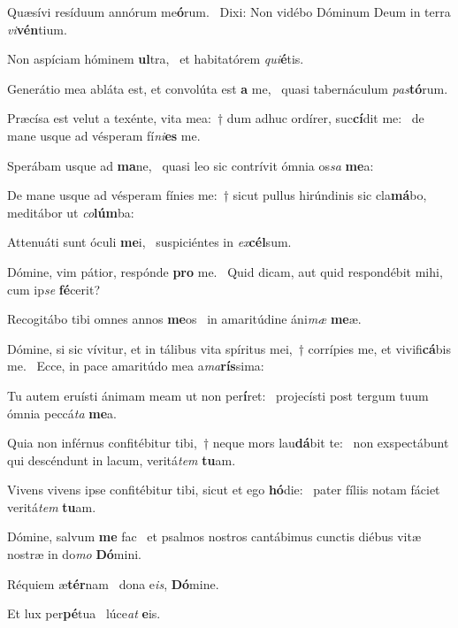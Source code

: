 \item Quæsívi resíduum annórum me\textbf{ó}rum.~\psstar{} Dixi: Non vidébo Dóminum Deum in terra \textit{vi}\textbf{vén}tium.

\item Non aspíciam hóminem \textbf{ul}tra,~\psstar{} et habitatórem \textit{qui}\textbf{é}tis.

\item Generátio mea abláta est, et convolúta est \textbf{a} me,~\psstar{} quasi tabernáculum \textit{pas}\textbf{tó}rum.

\item Præcísa est velut a texénte, vita mea:~† dum adhuc ordírer, suc\textbf{cí}dit me:~\psstar{} de mane usque ad vésperam fí\textit{ni}\textbf{es} me.

\item Sperábam usque ad \textbf{ma}ne,~\psstar{} quasi leo sic contrívit ómnia os\textit{sa} \textbf{me}a:

\item De mane usque ad vésperam fínies me:~† sicut pullus hirúndinis sic cla\textbf{má}bo,~\psstar{} meditábor ut \textit{co}\textbf{lúm}ba:

\item Attenuáti sunt óculi \textbf{me}i,~\psstar{} suspiciéntes in \textit{ex}\textbf{cél}sum.

\item Dómine, vim pátior, respónde \textbf{pro} me.~\psstar{} Quid dicam, aut quid respondébit mihi, cum ip\textit{se} \textbf{fé}cerit?

\item Recogitábo tibi omnes annos \textbf{me}os~\psstar{} in amaritúdine áni\textit{mæ} \textbf{me}æ.

\item Dómine, si sic vívitur, et in tálibus vita spíritus mei,~† corrípies me, et vivifi\textbf{cá}bis me.~\psstar{} Ecce, in pace amaritúdo mea a\textit{ma}\textbf{rís}sima:

\item Tu autem eruísti ánimam meam ut non per\textbf{í}ret:~\psstar{} projecísti post tergum tuum ómnia peccá\textit{ta} \textbf{me}a.

\item Quia non inférnus confitébitur tibi,~† neque mors lau\textbf{dá}bit te:~\psstar{} non exspectábunt qui descéndunt in lacum, veritá\textit{tem} \textbf{tu}am.

\item Vivens vivens ipse confitébitur tibi, sicut et ego \textbf{hó}die:~\psstar{} pater fíliis notam fáciet veritá\textit{tem} \textbf{tu}am.

\item Dómine, salvum \textbf{me} fac~\psstar{} et psalmos nostros cantábimus cunctis diébus vitæ nostræ in do\textit{mo} \textbf{Dó}mini.

\item Réquiem æ\textbf{tér}nam~\psstar{} dona e\textit{is}, \textbf{Dó}mine.

\item Et lux per\textbf{pé}tua~\psstar{} lúce\textit{at} \textbf{e}is.